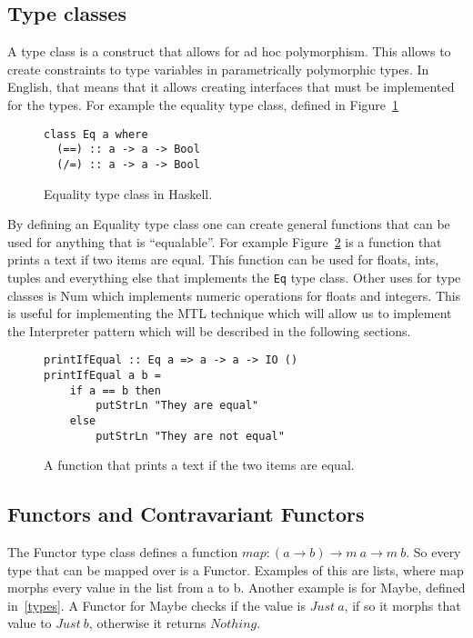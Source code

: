 \subsection{Type classes}\label{typeclass}

A type class is a construct that allows for ad hoc polymorphism. This allows to
create constraints to type variables in parametrically polymorphic types. In
English, that means that it allows creating interfaces that must be implemented
for the types. For example the equality type class, defined in
Figure~\ref{equalitytypeclass}

\begin{figure}[H]
    \begin{lstlisting}
class Eq a where
  (==) :: a -> a -> Bool
  (/=) :: a -> a -> Bool
    \end{lstlisting}
    \caption{Equality type class in Haskell.}
    \label{equalitytypeclass}
\end{figure}

By defining an Equality type class one can create general functions that can be
used for anything that is ``equalable''. For example Figure~\ref{printifequal}
is a function that prints a text if two items are equal. This function can be
used for floats, ints, tuples and everything else that implements the
\texttt{Eq} type class. Other uses for type classes is Num which implements
numeric operations for floats and integers. This is useful for implementing the
MTL technique which will allow us to implement the Interpreter pattern which
will be described in the following sections.

\begin{figure}[H]
    \begin{lstlisting}
printIfEqual :: Eq a => a -> a -> IO ()
printIfEqual a b =
	if a == b then
		putStrLn "They are equal"
	else
		putStrLn "They are not equal"
    \end{lstlisting}
    \caption{A function that prints a text if the two items are equal.}
    \label{printifequal}
\end{figure}

\subsection{Functors and Contravariant Functors}

The Functor type class defines a function $map : (a\rightarrow b) \rightarrow m\
a \rightarrow m\ b$. So every type that can be mapped over is a Functor.
Examples of this are lists, where map morphs every value in the list from a to
b. Another example is for Maybe, defined in~\ref{types}. A Functor for Maybe
checks if the value is $Just\ a$, if so it morphs that value to $Just\ b$,
otherwise it returns $Nothing$. 

